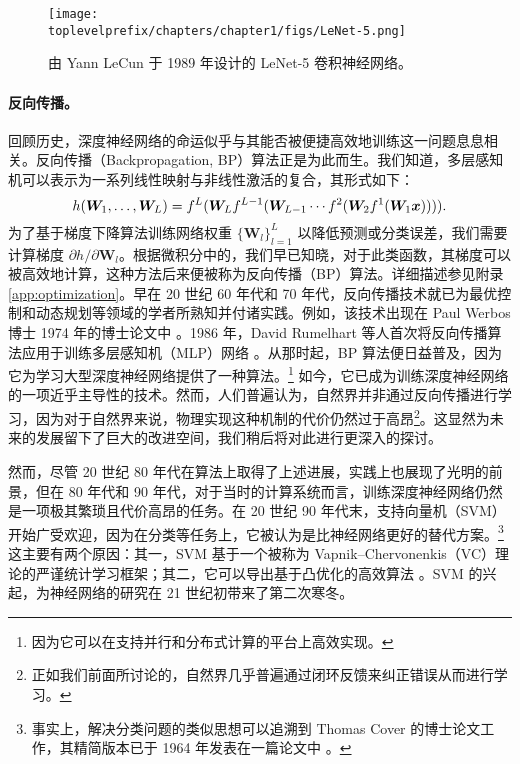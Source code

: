 \documentclass[../../book-main.tex]{subfiles}
\begin{document}
\begin{figure}
    \centering
\texttt{[image: \\toplevelprefix/chapters/chapter1/figs/LeNet-5.png]}
    \caption{由 Yann LeCun 于 1989 年设计的 LeNet-5 卷积神经网络。}
    \label{fig:LeNet-5}
\end{figure}

\paragraph{反向传播。}
回顾历史，深度神经网络的命运似乎与其能否被便捷高效地训练这一问题息息相关。反向传播（Backpropagation, BP）算法正是为此而生。我们知道，多层感知机可以表示为一系列线性映射与非线性激活的复合，其形式如下：
\begin{equation}
h(\bm W_1, \ldots, \bm W_L) = f^L(\bm W_Lf^{L-1}(\bm W_{L-1} \cdots f^2(\bm W_2f^1(\bm W_1\bm{x})))).
\end{equation}
为了基于梯度下降算法训练网络权重 $\{\bm W_l\}_{l=1}^L$ 以降低预测或分类误差，我们需要计算梯度 ${\partial h}/{\partial \bm W_l}$。根据微积分中的{}，我们早已知晓，对于此类函数，其梯度可以被高效地计算，这种方法后来便被称为反向传播（BP）算法。详细描述参见附录 \ref{app:optimization}。早在 20 世纪 60 年代和 70 年代，反向传播技术就已为最优控制和动态规划等领域的学者所熟知并付诸实践。例如，该技术出现在 Paul Werbos 博士 1974 年的博士论文中 \cite{Werbos-1974, Werbos1994TheRO}。1986 年，David Rumelhart 等人首次将反向传播算法应用于训练多层感知机（MLP）网络 \cite{Rumelhart1986}。从那时起，BP 算法便日益普及，因为它为学习大型深度神经网络提供了一种{}算法。\footnote{因为它可以在支持并行和分布式计算的平台上高效实现。} 如今，它已成为训练深度神经网络的一项近乎主导性的技术。然而，人们普遍认为，自然界并非通过反向传播进行学习，因为对于自然界来说，物理实现这种机制的代价仍然过于高昂\footnote{正如我们前面所讨论的，自然界几乎普遍通过闭环反馈来纠正错误从而进行学习。}。这显然为未来的发展留下了巨大的改进空间，我们稍后将对此进行更深入的探讨。

然而，尽管 20 世纪 80 年代在算法上取得了上述进展，实践上也展现了光明的前景，但在 80 年代和 90 年代，对于当时的计算系统而言，训练深度神经网络仍然是一项极其繁琐且代价高昂的任务。在 20 世纪 90 年代末，支持向量机（SVM）\cite{SVM-1995} 开始广受欢迎，因为在分类等任务上，它被认为是比神经网络更好的替代方案。\footnote{事实上，解决分类问题的类似思想可以追溯到 Thomas Cover 的博士论文工作，其精简版本已于 1964 年发表在一篇论文中 \cite{Cover-1964}。} 这主要有两个原因：其一，SVM 基于一个被称为 Vapnik–Chervonenkis（VC）理论的严谨统计学习框架；其二，它可以导出基于凸优化的高效算法 \cite{BoydVa04}。SVM 的兴起，为神经网络的研究在 21 世纪初带来了第二次寒冬。
\end{document}
